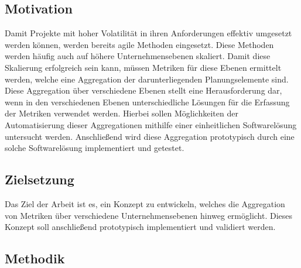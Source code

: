\subsection{Motivation}
Damit Projekte mit hoher Volatilität in ihren Anforderungen effektiv umgesetzt werden können, werden bereits agile Methoden eingesetzt. Diese Methoden werden häufig auch auf höhere Unternehmensebenen skaliert. Damit diese Skalierung erfolgreich sein kann, müssen Metriken für diese Ebenen ermittelt werden, welche eine Aggregation der darunterliegenden Planungselemente sind. Diese Aggregation über verschiedene Ebenen stellt eine Herausforderung dar, wenn in den verschiedenen Ebenen unterschiedliche Lösungen für die Erfassung der Metriken verwendet werden. Hierbei sollen Möglichkeiten der Automatisierung dieser Aggregationen mithilfe einer einheitlichen Softwarelösung untersucht werden. Anschließend wird diese Aggregation prototypisch durch eine solche Softwarelösung implementiert und getestet.

\subsection{Zielsetzung}
Das Ziel der Arbeit ist es, ein Konzept zu entwickeln, welches die Aggregation von Metriken über verschiedene Unternehmensebenen hinweg ermöglicht. Dieses Konzept soll anschließend prototypisch implementiert und validiert werden.

\subsection{Methodik}


